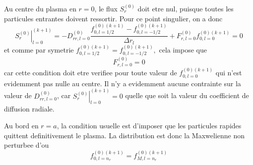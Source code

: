 Au centre du plasma en $r=0$, le flux $S_{r}^{\left(0\right)}$ doit
etre nul, puisque toutes les particules entrantes doivent ressortir.
Pour ce point singulier, on a donc \[
\left.S_{r}^{\left(0\right)}\right|_{l=0}^{(k+1)}=-D_{rr,l=0}^{\left(0\right)}\frac{f_{0,l=1/2}^{\left(0\right)(k+1)}-f_{0,l=-1/2}^{\left(0\right)(k+1)}}{\Delta r_{l}}+F_{r,l=0}^{\left(0\right)}f_{0,l=0}^{\left(0\right)(k+1)}=0\]
 et comme par symetrie $f_{0,l=1/2}^{\left(0\right)(k+1)}=f_{0,l=-1/2}^{\left(0\right)(k+1)},$
cela impose que \[
F_{r,l=0}^{\left(0\right)}=0\]
 car cette condition doit etre verifiee pour toute valeur de $f_{0,l=0}^{\left(0\right)(k+1)}$
qui n'est evidemment pas nulle au centre. Il n'y a evidemment aucune
contrainte sur la valeur de $D_{rr,l=0}^{\left(0\right)}$, car $\left.S_{r}^{\left(0\right)}\right|_{l=0}^{(k+1)}=0$
quelle que soit la valeur du coefficient de diffusion radiale.

Au bord en $r=a$, la condition usuelle est d'imposer que les particules
rapides quittent definitivement le plasma. La distribution est donc
la Maxwelienne non perturbee d'ou \[
f_{0,l=n_{r}}^{\left(0\right)(k+1)}=f_{M,l=n_{r}}^{\left(0\right)(k+1)}\]

